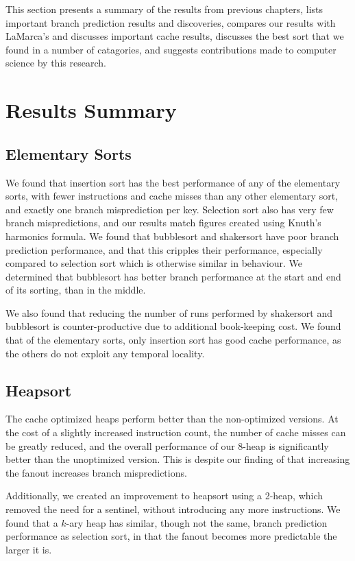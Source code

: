 \label{conclusions}
This section presents a summary of the results from previous chapters, lists
important branch prediction results and discoveries, compares our results with
LaMarca's and discusses important cache results, discusses the best sort that we
found in a number of catagories, and suggests contributions made to computer
science by this research.

\section{Results Summary}


\subsection{Elementary Sorts}

We found that insertion sort has the best performance of any of the elementary
sorts, with fewer instructions and cache misses than any other elementary sort,
and exactly one branch misprediction per key. Selection sort also has very few
branch mispredictions, and our results match figures created using Knuth's
harmonics formula. We found that bubblesort and shakersort have poor branch
prediction performance, and that this cripples their performance, especially
compared to selection sort which is otherwise similar in behaviour. We
determined that bubblesort has better branch performance at the start and end of
its sorting, than in the middle.

We also found that reducing the number of runs performed by shakersort and
bubblesort is counter-productive due to additional book-keeping cost. We found
that of the elementary sorts, only insertion sort has good cache performance, as
the others do not exploit any temporal locality.


\subsection{Heapsort}

The cache optimized heaps perform better than the non-optimized versions. At the
cost of a slightly increased instruction count, the number of cache misses can
be greatly reduced, and the overall performance of our 8-heap is significantly
better than the unoptimized version. This is despite our finding of that
increasing the fanout increases branch mispredictions.

Additionally, we created an improvement to heapsort using a 2-heap, which
removed the need for a sentinel, without introducing any more instructions. We
found that a $k$-ary heap has similar, though not the same, branch prediction
performance as selection sort, in that the fanout becomes more predictable the
larger it is.


